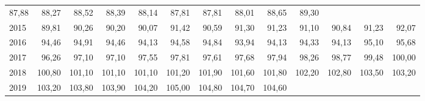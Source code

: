 \begin{tabular}{lllllllllllll}
  \multicolumn{1}{r}{87,88} &
  \multicolumn{1}{r}{88,27} &
  \multicolumn{1}{r}{88,52} &
  \multicolumn{1}{r}{88,39} &
  \multicolumn{1}{r}{88,14} &
  \multicolumn{1}{r}{87,81} &
  \multicolumn{1}{r}{87,81} &
  \multicolumn{1}{r}{88,01} &
  \multicolumn{1}{r}{88,65} &
  \multicolumn{1}{r}{89,30} \\
\multicolumn{1}{l}{\hspace{1em}2015} &
  \multicolumn{1}{|r}{89,81} &
  \multicolumn{1}{r}{90,26} &
  \multicolumn{1}{r}{90,20} &
  \multicolumn{1}{r}{90,07} &
  \multicolumn{1}{r}{91,42} &
  \multicolumn{1}{r}{90,59} &
  \multicolumn{1}{r}{91,30} &
  \multicolumn{1}{r}{91,23} &
  \multicolumn{1}{r}{91,10} &
  \multicolumn{1}{r}{90,84} &
  \multicolumn{1}{r}{91,23} &
  \multicolumn{1}{r}{92,07} \\
\multicolumn{1}{l}{\hspace{1em}2016} &
  \multicolumn{1}{|r}{94,46} &
  \multicolumn{1}{r}{94,91} &
  \multicolumn{1}{r}{94,46} &
  \multicolumn{1}{r}{94,13} &
  \multicolumn{1}{r}{94,58} &
  \multicolumn{1}{r}{94,84} &
  \multicolumn{1}{r}{93,94} &
  \multicolumn{1}{r}{94,13} &
  \multicolumn{1}{r}{94,33} &
  \multicolumn{1}{r}{94,13} &
  \multicolumn{1}{r}{95,10} &
  \multicolumn{1}{r}{95,68} \\
\multicolumn{1}{l}{\hspace{1em}2017} &
  \multicolumn{1}{|r}{96,26} &
  \multicolumn{1}{r}{97,10} &
  \multicolumn{1}{r}{97,10} &
  \multicolumn{1}{r}{97,55} &
  \multicolumn{1}{r}{97,81} &
  \multicolumn{1}{r}{97,61} &
  \multicolumn{1}{r}{97,68} &
  \multicolumn{1}{r}{97,94} &
  \multicolumn{1}{r}{98,26} &
  \multicolumn{1}{r}{98,77} &
  \multicolumn{1}{r}{99,48} &
  \multicolumn{1}{r}{100,00} \\
\multicolumn{1}{l}{\hspace{1em}2018} &
  \multicolumn{1}{|r}{100,80} &
  \multicolumn{1}{r}{101,10} &
  \multicolumn{1}{r}{101,10} &
  \multicolumn{1}{r}{101,10} &
  \multicolumn{1}{r}{101,20} &
  \multicolumn{1}{r}{101,90} &
  \multicolumn{1}{r}{101,60} &
  \multicolumn{1}{r}{101,80} &
  \multicolumn{1}{r}{102,20} &
  \multicolumn{1}{r}{102,80} &
  \multicolumn{1}{r}{103,50} &
  \multicolumn{1}{r}{103,20} \\
\multicolumn{1}{l}{\hspace{1em}2019} &
  \multicolumn{1}{|r}{103,20} &
  \multicolumn{1}{r}{103,80} &
  \multicolumn{1}{r}{103,90} &
  \multicolumn{1}{r}{104,20} &
  \multicolumn{1}{r}{105,00} &
  \multicolumn{1}{r}{104,80} &
  \multicolumn{1}{r}{104,70} &
  \multicolumn{1}{r}{104,60} &

\end{tabular}
